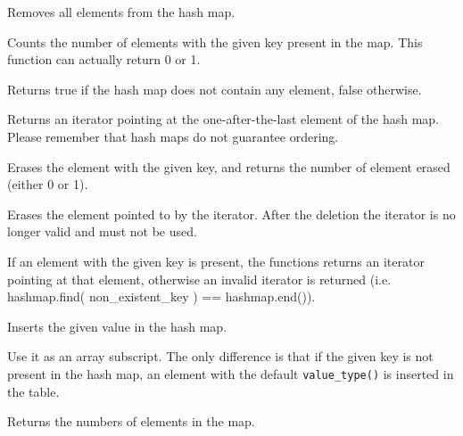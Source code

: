 Removes all elements from the hash map.



Counts the number of elements with the given key present in the map.
This function can actually return 0 or 1.



Returns true if the hash map does not contain any element, false otherwise.




Returns an iterator pointing at the one-after-the-last element of the hash map.
Please remember that hash maps do not guarantee ordering.



Erases the element with the given key, and returns the number of element
erased (either 0 or 1).



Erases the element pointed to by the iterator. After the deletion
the iterator is no longer valid and must not be used.




If an element with the given key is present, the functions returns
an iterator pointing at that element, otherwise an invalid iterator
is returned (i.e. hashmap.find( non\_existent\_key ) == hashmap.end()).



Inserts the given value in the hash map.



Use it as an array subscript. The only difference is that if the
given key is not present in the hash map, an element with the
default {\tt value\_type()} is inserted in the table.



Returns the numbers of elements in the map.

